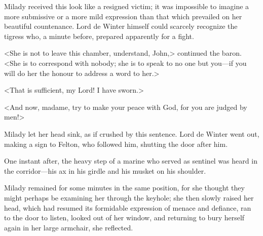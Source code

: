 Milady received this look like a resigned victim; it was impossible to imagine a more submissive or a more mild expression than that which prevailed on her beautiful countenance. Lord de Winter himself could scarcely recognize the tigress who, a minute before, prepared apparently for a fight. 

<She is not to leave this chamber, understand, John,> continued the baron. <She is to correspond with nobody; she is to speak to no one but you—if you will do her the honour to address a word to her.> 

<That is sufficient, my Lord! I have sworn.> 

<And now, madame, try to make your peace with God, for you are judged by men!> 

Milady let her head sink, as if crushed by this sentence. Lord de Winter went out, making a sign to Felton, who followed him, shutting the door after him. 

One instant after, the heavy step of a marine who served as sentinel was heard in the corridor—his ax in his girdle and his musket on his shoulder. 

Milady remained for some minutes in the same position, for she thought they might perhaps be examining her through the keyhole; she then slowly raised her head, which had resumed its formidable expression of menace and defiance, ran to the door to listen, looked out of her window, and returning to bury herself again in her large armchair, she reflected. 